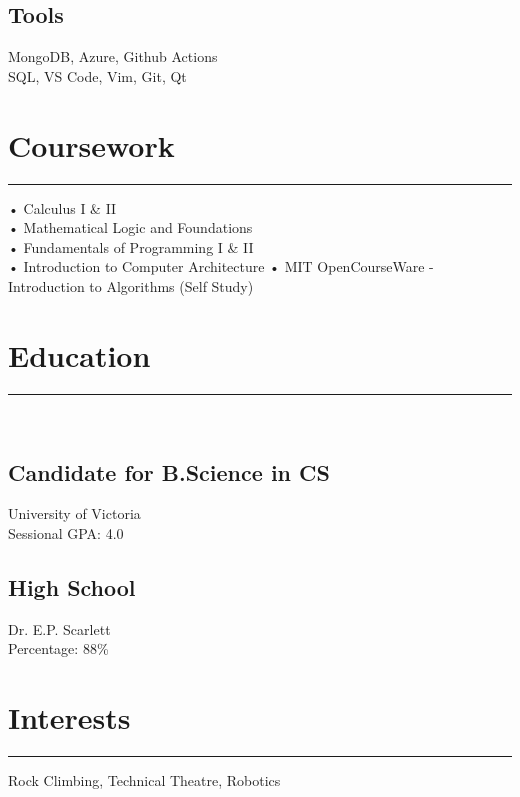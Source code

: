 \documentclass[]{resume}
\begin{document}
\begin{minipage}[t]{0.30\textwidth}
\subsection{Tools}
MongoDB, Azure, Github Actions \\ SQL, VS Code, Vim, Git, Qt
\sectionsep
\section{Coursework}
\noindent\rule{5cm}{0.4pt}

• Calculus I \& II \\
• Mathematical Logic and Foundations\\
• Fundamentals of Programming I \& II\\
• Introduction to Computer Architecture
• MIT OpenCourseWare - \\Introduction to Algorithms (Self Study)
\sectionsep
\section{Education} 
\noindent\rule{5cm}{0.4pt}\\
\subsection{Candidate for B.Science in CS}
University of Victoria \\
Sessional GPA: 4.0\\
\vspace{8pt}
\subsection{High School}
Dr. E.P. Scarlett\\
Percentage: 88\%
\section{Interests}
\noindent\rule{5cm}{0.4pt}

Rock Climbing, Technical Theatre, Robotics
\sectionsep
%
%

\end{minipage} 
\hfill
\end{document}
